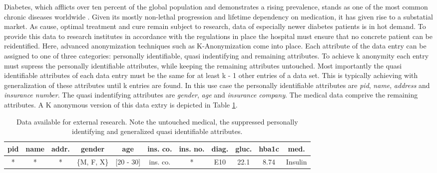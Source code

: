 Diabetes, which afflicts over ten percent of the global population and demonstrates a rising prevalence, stands as one of the most common chronic diseases worldwide \cite{idf2023,WHODiabetes2023}. Given its mostly non-lethal progression and lifetime dependency on medication, 
it has given rise to a substatial market. As cause, optimal treatment and cure remain subject to research, data of especially newer diabetes patients is in hot demand. To provide this data to research institutes in accordance with the regulations in place the hospital must ensure that no concrete patient can be reidentified. 
Here, advanced anonymization techniques such as K-Anonymization come into place. Each attribute of the data entry can be assigned to one of three categories: personally identifiable, quasi indentifying and remaining attributes. To achieve k anonymity each entry must supress the personally identifiable attributes, while keeping the remaining attributes untouched. 
Most importantly the quasi identifiable attributes of each data entry must be the same for at least k - 1 other entries of a data set. This is typically achieving with generalization of these attributes until k entries are found. In this use case the personally identifiable attributes are \textit{pid}, \textit{name}, \textit{address} and \textit{insurance number}. 
The quasi indentifying attributes are \textit{gender}, \textit{age} and \textit{insurance company}. The medical data comprive the remaining attributes. A K anonymous version of this data extry is depicted in Table \ref{table:k_anon}.

\bigskip

\begin{table}[ht]
    \begin{center}
    \footnotesize{
        \renewcommand{\arraystretch}{1.5}
        \begin{tabular}{ | c | c | c | c | c | c | c | c | c | c | c | } 
            \hline
            pid & name & addr. & gender & age & ins. co. & ins. no. & diag. & gluc. & hba1c & med. \\
            \hline
            * & * & * & \{M, F, X\} & {[20 - 30]} & ins. co. & * & E10 & 22.1 & 8.74 & Insulin \\
            \hline
        \end{tabular}
    }
    \caption{Data available for external research. Note the untouched medical, the suppressed personally identifying and generalized quasi identifiable attributes.}
    \label{table:k_anon}
    \end{center}
\end{table}

